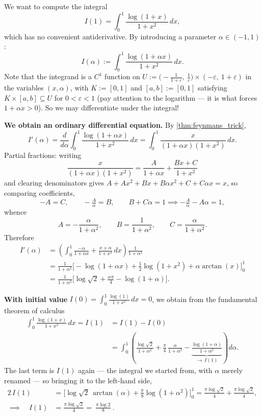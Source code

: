 \begin{example}
\label{ex:feynman_log_integral}
We want to compute the integral
\[I(1) = \int_0^1 \frac{\log(1+x)}{1+x^2}\,dx,\]
which has no convenient antiderivative. By introducing a parameter $\alpha \in (-1,1)$:
\[I(\alpha) := \int_0^1 \frac{\log(1+\alpha x)}{1+x^2}\,dx.\]
Note that the integrand is a $C^1$ function on
$U := \big(-\tfrac{1}{1+\varepsilon},\ \tfrac1\varepsilon\big) \times (-\varepsilon,\ 1+\varepsilon)$
in the variables $(x,\alpha)$, with $K := [0,1]$ and $[a,b] := [0,1]$ satisfying
$K\times[a,b] \subseteq U$ for $0 < \varepsilon < 1$ (pay attention to the logarithm --- it is
what forces $1+\alpha x > 0$). So we may differentiate under the integral!

\textbf{We obtain an ordinary differential equation.} By \cref{thm:feynmans_trick},
\[I'(\alpha) = \frac{d}{d\alpha}\int_0^1 \frac{\log(1+\alpha x)}{1+x^2}\,dx
  = \int_0^1 \frac{x}{(1+\alpha x)(1+x^2)}\,dx.\]
Partial fractions: writing
\[\frac{x}{(1+\alpha x)(1+x^2)} = \frac{A}{1+\alpha x} + \frac{Bx+C}{1+x^2}\]
and clearing denominators gives $A + Ax^2 + Bx + B\alpha x^2 + C + C\alpha x = x$, so comparing
coefficients,
\[-A = C, \qquad -\tfrac{A}{\alpha} = B, \qquad B + C\alpha = 1
  \implies -\tfrac{A}{\alpha} - A\alpha = 1,\]
whence
\[A = -\frac{\alpha}{1+\alpha^2}, \qquad B = \frac{1}{1+\alpha^2}, \qquad C = \frac{\alpha}{1+\alpha^2}.\]
Therefore
\[
\begin{aligned}
I'(\alpha) &= \left(\int_0^1 \frac{-\alpha}{1+\alpha x} + \frac{x+\alpha}{1+x^2}\,dx\right)\frac{1}{1+\alpha^2} \\
&= \frac{1}{1+\alpha^2}\Big[-\log(1+\alpha x) + \tfrac12\log(1+x^2) + \alpha\arctan(x)\Big]_0^1 \\
&= \frac{1}{1+\alpha^2}\Big[\log\sqrt2 + \tfrac{\alpha\pi}{4} - \log(1+\alpha)\Big].
\end{aligned}
\]

\textbf{With initial value} $I(0) = \int_0^1 \frac{\log(1)}{1+x^2}\,dx = 0$, we obtain from the
fundamental theorem of calculus
\[
\begin{aligned}
\int_0^1 \frac{\log(1+x)}{1+x^2}\,dx = I(1) &= I(1)-I(0) \\
&= \int_0^1\left(\frac{\log\sqrt2}{1+\alpha^2} + \frac{\pi}{4}\,\frac{\alpha}{1+\alpha^2}
   - \underbrace{\frac{\log(1+\alpha)}{1+\alpha^2}}_{\textstyle \to\, I(1)}\right)d\alpha.
\end{aligned}
\]
The last term is $I(1)$ again --- the integral we started from, with $\alpha$ merely renamed ---
so bringing it to the left-hand side,
\[
\begin{aligned}
2\,I(1) &= \Big[\log\sqrt2\,\arctan(\alpha) + \tfrac{\pi}{8}\log(1+\alpha^2)\Big]_0^1
 = \frac{\pi\log\sqrt2}{4} + \frac{\pi\log\sqrt2}{4}, \\[1ex]
\implies\quad I(1) &= \frac{\pi\log\sqrt2}{4} = \boxed{\ \frac{\pi\log 2}{8}\ }.
\end{aligned}
\]
\end{example}

